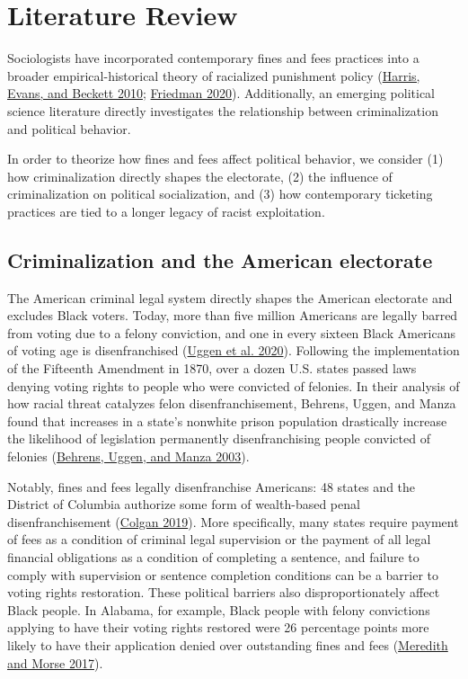 \documentclass[
  12pt,
]{article}
\begin{document}
\hypertarget{literature-review}{%
\section*{Literature Review}\label{literature-review}}

Sociologists have incorporated contemporary fines and fees practices into a broader empirical-historical theory of racialized punishment policy (\protect\hyperlink{ref-Harris2010}{Harris, Evans, and Beckett 2010}; \protect\hyperlink{ref-Friedman2020}{Friedman 2020}). Additionally, an emerging political science literature directly investigates the relationship between criminalization and political behavior.

In order to theorize how fines and fees affect political behavior, we consider (1) how criminalization directly shapes the electorate, (2) the influence of criminalization on political socialization, and (3) how contemporary ticketing practices are tied to a longer legacy of racist exploitation.

\hypertarget{criminalization-and-the-american-electorate}{%
\subsection*{Criminalization and the American electorate}\label{criminalization-and-the-american-electorate}}

The American criminal legal system directly shapes the American electorate and excludes Black voters. Today, more than five million Americans are legally barred from voting due to a felony conviction, and one in every sixteen Black Americans of voting age is disenfranchised (\protect\hyperlink{ref-Uggen2020}{Uggen et al. 2020}). Following the implementation of the Fifteenth Amendment in 1870, over a dozen U.S. states passed laws denying voting rights to people who were convicted of felonies. In their analysis of how racial threat catalyzes felon disenfranchisement, Behrens, Uggen, and Manza found that increases in a state's nonwhite prison population drastically increase the likelihood of legislation permanently disenfranchising people convicted of felonies (\protect\hyperlink{ref-Behrens2003}{Behrens, Uggen, and Manza 2003}).

Notably, fines and fees legally disenfranchise Americans: 48 states and the District of Columbia authorize some form of wealth-based penal disenfranchisement (\protect\hyperlink{ref-Colgan2019}{Colgan 2019}). More specifically, many states require payment of fees as a condition of criminal legal supervision or the payment of all legal financial obligations as a condition of completing a sentence, and failure to comply with supervision or sentence completion conditions can be a barrier to voting rights restoration. These political barriers also disproportionately affect Black people. In Alabama, for example, Black people with felony convictions applying to have their voting rights restored were 26 percentage points more likely to have their application denied over outstanding fines and fees (\protect\hyperlink{ref-Meredith2017}{Meredith and Morse 2017}).
\end{document}
